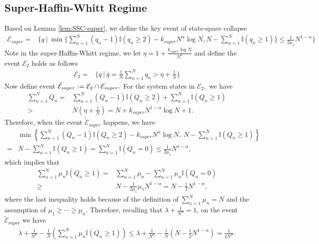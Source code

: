 \documentclass[11pt,oneside,letter]{article}
\begin{document}
\subsection*{Super-Haffin-Whitt Regime}
Based on Lemma \ref{lem:SSC-super}, we define the key event of state-space collapse 
\begin{align}
\mathcal E_{super}=&\{q~|~ 
\min\{\sum_{n=1}^{N} (q_n-1)\mathbb{I}(q_n\geq 2)- k_{super} N^\alpha \log N, N -\sum_{n=1}^{N} \mathbb{I}(q_n\geq 1 ) \}\leq \frac{1}{2\mu_1}  N^{1-\alpha}\}
\end{align}
Note in the super-Haffin-Whitt regime, we let $\eta = 1 + \frac{k_{super}\log N}{N^{\alpha}}$ and define the event $\mathcal E_2$ holds as follows 
\begin{align}
\mathcal E_{2}=&\{q~|~ \bar q = \frac{1}{N}\sum_{n=1}^{N} q_n> \eta + \frac{1}{N}\}
\end{align}
Now define event $\tilde{\cal E}_{super} := \mathcal E_2 \cap \mathcal E_{super}.$ 
For the system states in $\mathcal E_2,$ we have
\begin{align*}
\sum_{n=1}^{N} Q_n =& \sum_{n=1}^{N} (Q_n-1)\mathbb I(Q_n \geq 2) + \sum_{n=1}^{N} \mathbb I(Q_n \geq 1)\\
>& N(\eta + \frac{1}{N}) = N + k_{super} N^{1-\alpha}\log N+1. 
\end{align*} Therefore, when the event $\tilde{\mathcal E}_{super}$ happens, we have  
\begin{align*}
&\min\left\{\sum_{n=1}^{N} (Q_n-1)\mathbb{I}(Q_n\geq 2) - k_{super} N^\alpha \log N, ~ N- \sum_{n=1}^{N} \mathbb{I}(Q_n\geq 1) \right\} \\
=& N - \sum_{n=1}^{N} \mathbb{I}(Q_n\geq 1) = \sum_{n=1}^{N} \mathbb{I}(Q_n = 0) \leq \frac{1}{2\mu_1} N^{1-\alpha}, 
\end{align*}
which implies that 
\begin{align*}
\sum_{n=1}^{N} \mu_n \mathbb{I}(Q_n\geq 1) 
=& \sum_{n=1}^{N} \mu_n - \sum_{n=1}^{N} \mu_n \mathbb{I}(Q_n = 0) \\
\geq& N - \frac{1}{2\mu_1} \mu_1 N^{1-\alpha} 
= N - \frac{1}{2} N^{1-\alpha},
\end{align*}
where the last inequality holds because of the definition of $\sum_{n=1}^{N} \mu_n = N$ and the assumption of $\mu_1 \geq \cdots \geq \mu_n$.  
{Therefore, recalling that $\lambda + \frac{1}{N^{\alpha}} = 1$, on the event $\tilde{\mathcal E}_{\mathrm{super}}$ we have
\begin{align}
\lambda+\frac{1}{N^{\alpha}}-\frac{1}{N}\left(\sum_{n=1}^{N} \mu_n \mathbb{I}(Q_n\geq 1)\right)\leq \lambda+\frac{1}{N^{\alpha}}-\frac{1}{N}(N - \frac{1}{2} N^{1-\alpha}) = \frac{1}{2N^\alpha}.   \label{eq:largeservice super} 
\end{align}}
\end{document}
